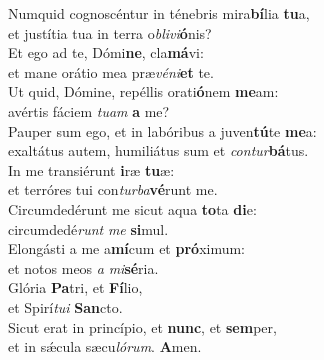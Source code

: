 \oddverse Numquid cognoscéntur in ténebris mira\textbf{bí}lia \textbf{tu}a,~\*\\
\oddverse et justítia tua in terra o\textit{bli}\textit{vi}\textbf{ó}nis?\\
\evenverse Et ego ad te, Dómi\textbf{ne}, cla\textbf{má}vi:~\*\\
\evenverse et mane orátio mea præ\textit{vé}\textit{ni}\textbf{et} te.\\
\oddverse Ut quid, Dómine, repéllis orati\textbf{ó}nem \textbf{me}am:~\*\\
\oddverse avértis fáciem \textit{tu}\textit{am} \textbf{a} me?\\
\evenverse Pauper sum ego, et in labóribus a juven\textbf{tú}te \textbf{me}a:~\*\\
\evenverse exaltátus autem, humiliátus sum et \textit{con}\textit{tur}\textbf{bá}tus.\\
\oddverse In me transiérunt \textbf{i}ræ \textbf{tu}æ:~\*\\
\oddverse et terróres tui con\textit{tur}\textit{ba}\textbf{vé}runt me.\\
\evenverse Circumdedérunt me sicut aqua \textbf{to}ta \textbf{di}e:~\*\\
\evenverse circumdedé\textit{runt} \textit{me} \textbf{si}mul.\\
\oddverse Elongásti a me a\textbf{mí}cum et \textbf{pró}ximum:~\*\\
\oddverse et notos meos \textit{a} \textit{mi}\textbf{sé}ria.\\
\evenverse Glória \textbf{Pa}tri, et \textbf{Fí}lio,~\*\\
\evenverse et Spirí\textit{tu}\textit{i} \textbf{San}cto.\\
\oddverse Sicut erat in princípio, et \textbf{nunc}, et \textbf{sem}per,~\*\\
\oddverse et in sǽcula sæcu\textit{ló}\textit{rum}. \textbf{A}men.\\
